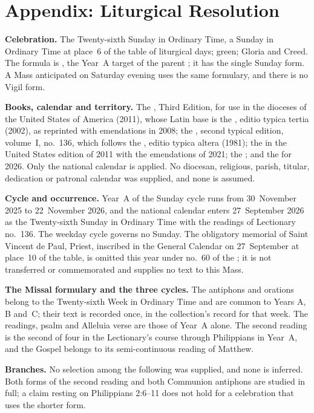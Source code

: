 \clearpage
\section{Appendix: Liturgical Resolution}
\label{sec:liturgical-resolution}

{\small
\textbf{Celebration.} The Twenty-sixth Sunday in Ordinary Time, a Sunday in
Ordinary Time at place~6 of the table of liturgical days; green; Gloria and
Creed. The formula is , the Year~A target of the parent
; it has the single Sunday form. A Mass anticipated on Saturday
evening uses the same formulary, and there is no Vigil form.

\textbf{Books, calendar and territory.} The , Third
Edition, for use in the dioceses of the United States of America (2011), whose
Latin base is the , editio typica tertia (2002), as
reprinted with emendations in 2008; the , second typical edition,
volume~I, no.~136, which follows the , editio
typica altera (1981); the  in the
United States edition of 2011 with the emendations of 2021; the
; and the
 for
2026. Only the national calendar is applied. No diocesan, religious, parish,
titular, dedication or patronal calendar was supplied, and none is assumed.

\textbf{Cycle and occurrence.} Year~A of the Sunday cycle runs from 30~November
2025 to 22~November 2026, and the national calendar enters 27~September 2026
as the Twenty-sixth Sunday in Ordinary Time with the readings of Lectionary
no.~136. The weekday cycle governs no Sunday. The obligatory memorial of Saint
Vincent de Paul, Priest, inscribed in the General Calendar on 27~September at
place~10 of the table, is omitted this year under no.~60 of the
; it is not transferred or commemorated and supplies no
text to this Mass.

\textbf{The Missal formulary and the three cycles.} The antiphons and orations
belong to the Twenty-sixth Week in Ordinary Time and are common to Years A, B
and~C; their text is recorded once, in the collection's record for that week.
The readings, psalm and Alleluia verse are those of Year~A alone. The second
reading is the second of four in the Lectionary's course through Philippians
in Year~A, and the Gospel belongs to its semi-continuous reading of Matthew.

\textbf{Branches.} No selection among the following was supplied, and none is
inferred. Both forms of the second reading and both Communion antiphons are
studied in full; a claim resting on Philippians 2:6--11 does not hold for a
celebration that uses the shorter form.
\par}

